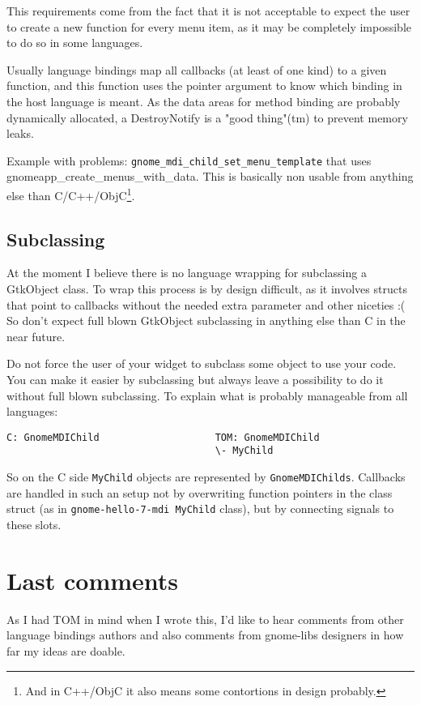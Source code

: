 \documentclass{article}
\begin{document}
This requirements come from the fact that it is not acceptable to
expect
the user to create a new function for every menu item, as it may be
completely impossible to do so in some languages.

Usually language bindings map all callbacks (at least of one kind) to a
    given function, and this function uses the pointer argument to
    know which binding in the host language is meant.  As the data
    areas for method binding are probably dynamically allocated, a
    DestroyNotify is a "good thing"(tm) to prevent memory leaks. 

Example with problems: {\tt gnome\_mdi\_child\_set\_menu\_template} that uses
    gnomeapp\_create\_menus\_with\_data. This is basically
    non usable from anything else than C/C++/ObjC\footnote{And in C++/ObjC it
    also means some contortions in design probably.}.

\subsection{Subclassing}
At the moment I believe there is
    no language wrapping for subclassing a GtkObject class. To wrap
    this process is by
    design difficult, as it involves structs that point to callbacks
    without the needed extra parameter and other niceties :( 
    So don't expect full blown GtkObject subclassing in anything else
    than C in the near future.

    Do not
    force the user of your widget to subclass some object to use your
    code. You can make it easier by subclassing but always leave a
    possibility to do it without full blown subclassing. To explain
    what is probably manageable from all languages: 
\begin{verbatim}
C: GnomeMDIChild                    TOM: GnomeMDIChild 
                                    \- MyChild 
\end{verbatim}
So on the C side {\tt MyChild} objects are
    represented by {\tt GnomeMDIChilds}. Callbacks are handled in such an
    setup not by overwriting function pointers in the class struct (as
    in {\tt gnome-hello-7-mdi MyChild} class), but by connecting signals to
    these slots.

\section{Last comments}
As I had TOM in mind when I wrote this, I'd like to hear comments
from other language bindings authors and also comments from gnome-libs
designers in how far my ideas are doable.
\end{document}

